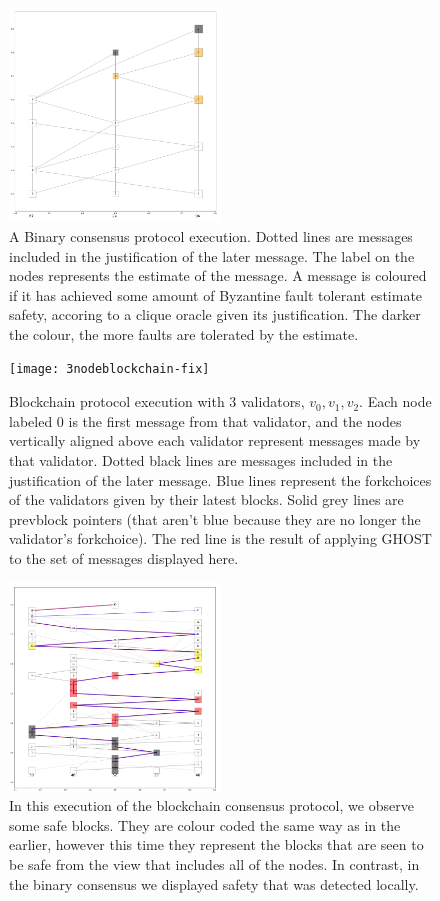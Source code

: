 \documentclass{article}
\theoremstyle{definition}
\begin{document}
\begin{figure}[h!]
\centering
\includegraphics[width=0.5\textwidth]{3binary}
\caption{A Binary consensus protocol execution. Dotted lines are messages included in the justification of the later message. The label on the nodes represents the estimate of the message. A message is coloured if it has achieved some amount of Byzantine fault tolerant estimate safety, accoring to a clique oracle given its justification. The darker the colour, the more faults are tolerated by the estimate.}
\end{figure}


\begin{figure}[h!]
\centering
\texttt{[image: 3nodeblockchain-fix]}
\caption{Blockchain protocol execution with 3 validators, $v_0, v_1, v_2$. Each node labeled $0$ is the first message from that validator, and the nodes vertically aligned above each validator represent messages made by that validator. Dotted black lines are messages included in the justification of the later message. Blue lines represent the forkchoices of the validators given by their latest blocks. Solid grey lines are prevblock pointers (that aren't blue because they are no longer the validator's forkchoice). The red line is the result of applying GHOST to the set of messages displayed here.}
\end{figure}


\begin{figure}[h!]
\centering
\includegraphics[width=0.5\textwidth]{blockchainsafety}
\caption{In this execution of the blockchain consensus protocol, we observe some safe blocks. They are colour coded the same way as in the earlier, however this time they represent the blocks that are seen to be safe from the view that includes all of the nodes. In contrast, in the binary consensus we displayed safety that was detected locally.}
\end{figure}
\end{document}
